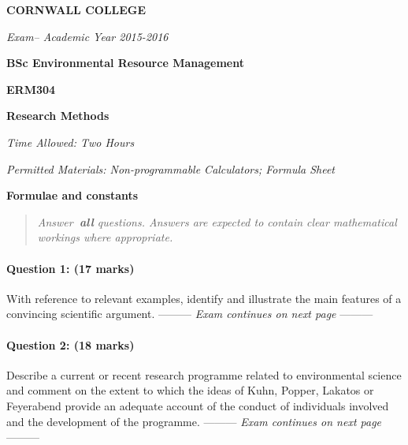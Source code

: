 \documentclass[a4paper,12pt,fleqn]{article}
\newcommand{\institution}{CORNWALL COLLEGE}
\newcommand{\titlehd}{BSc Environmental Resource Management}
\newcommand{\examtype}{Exam}
\newcommand{\examdate}{Academic Year 2015-2016}
\newcommand{\examcode}{ERM304}
\newcommand{\examtitle}{Research Methods}
\newcommand{\readtime}{15 Minutes}
\newcommand{\writetime}{Two Hours}
\newcommand{\materials}{Non-programmable Calculators; Formula Sheet}
\newcommand{\middlewords}{Exam continues on next page}
\begin{document}

\begin{center}
\large\textbf{\institution}
\end{center}
\vspace{1cm}

\begin{center}
\textit{ \examtype -- \examdate}
\end{center}
\vspace{1cm}

\begin{center}
\large\textbf{\titlehd}
\end{center}

\begin{center}
\large\textbf{\examcode}
\end{center}
\begin{center}
\large\textbf{\examtitle}
\end{center}
\vspace{4cm}
\vspace{4cm}

\begin{center}
\end{center}
\begin{center}
\textit{Time Allowed:  \writetime}
\end{center}
\begin{center}
\textit{Permitted Materials: \materials}
\end{center}

\newpage
\textbf{Formulae and constants}


\newpage
\begin{quote}
\textit{Answer\textbf{\ all} questions.  Answers are expected to contain clear mathematical workings where appropriate.}
\end{quote}

\bigskip

\paragraph{\textbf{Question 1: (17 marks)}}
With reference to relevant examples, identify and illustrate the main features of a convincing scientific argument.
\vspace{3cm}
--------- \textit{\middlewords} ---------

\newpage

\paragraph{\textbf{Question 2: (18 marks)}}
Describe a current or recent research programme related to environmental science and comment on the extent to which the ideas of Kuhn, Popper, Lakatos or Feyerabend provide an adequate account of the conduct of individuals involved and the development of the programme. 
\vspace{3cm}
--------- \textit{\middlewords} ---------
\end{document}
